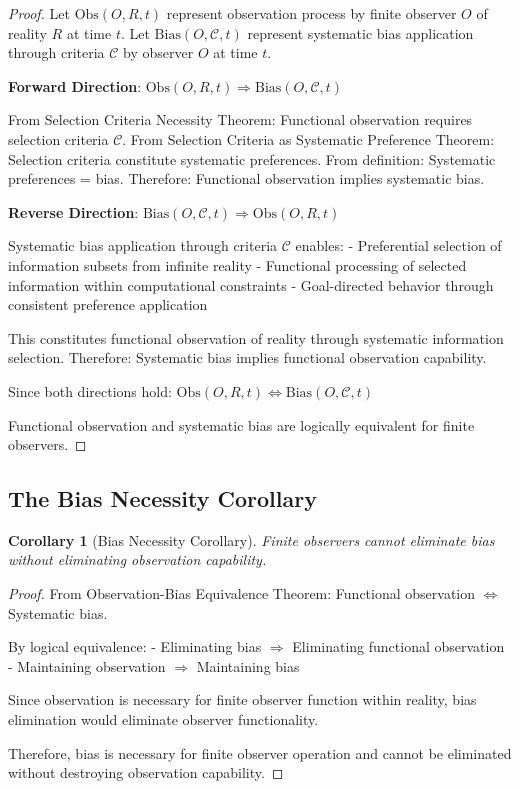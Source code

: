 \documentclass[12pt,a4paper]{article}
\newtheorem{corollary}[theorem]{Corollary}
\begin{document}
\begin{proof}
Let $\text{Obs}(O, R, t)$ represent observation process by finite observer $O$ of reality $R$ at time $t$.
Let $\text{Bias}(O, \mathcal{C}, t)$ represent systematic bias application through criteria $\mathcal{C}$ by observer $O$ at time $t$.

\textbf{Forward Direction}: $\text{Obs}(O, R, t) \Rightarrow \text{Bias}(O, \mathcal{C}, t)$

From Selection Criteria Necessity Theorem: Functional observation requires selection criteria $\mathcal{C}$.
From Selection Criteria as Systematic Preference Theorem: Selection criteria constitute systematic preferences.
From definition: Systematic preferences = bias.
Therefore: Functional observation implies systematic bias.

\textbf{Reverse Direction}: $\text{Bias}(O, \mathcal{C}, t) \Rightarrow \text{Obs}(O, R, t)$

Systematic bias application through criteria $\mathcal{C}$ enables:
- Preferential selection of information subsets from infinite reality
- Functional processing of selected information within computational constraints
- Goal-directed behavior through consistent preference application

This constitutes functional observation of reality through systematic information selection.
Therefore: Systematic bias implies functional observation capability.

Since both directions hold: $\text{Obs}(O, R, t) \Leftrightarrow \text{Bias}(O, \mathcal{C}, t)$

Functional observation and systematic bias are logically equivalent for finite observers.
\end{proof}

\subsection{The Bias Necessity Corollary}

\begin{corollary}[Bias Necessity Corollary]
Finite observers cannot eliminate bias without eliminating observation capability.
\end{corollary}

\begin{proof}
From Observation-Bias Equivalence Theorem: Functional observation $\Leftrightarrow$ Systematic bias.

By logical equivalence:
- Eliminating bias $\Rightarrow$ Eliminating functional observation
- Maintaining observation $\Rightarrow$ Maintaining bias

Since observation is necessary for finite observer function within reality, bias elimination would eliminate observer functionality.

Therefore, bias is necessary for finite observer operation and cannot be eliminated without destroying observation capability.
\end{proof}
\end{document}
